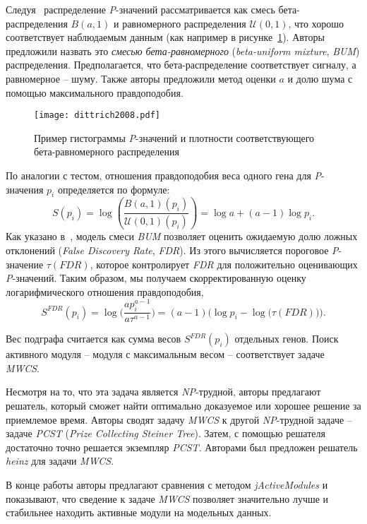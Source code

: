 Следуя~\cite{Pounds2003} распределение \emph{P}-значений рассматривается как
смесь бета-распределения $B(a, 1)$ и равномерного распределения
\(\mathcal{U}(0, 1)\), что хорошо соответствует наблюдаемым данным (как
например в рисунке~\ref{fig_dittrich2008}).  Авторы предложили назвать это
\emph{смесью бета-равномерного} (\emph{beta-uniform mixture}, \emph{BUM})
распределения.  Предполагается, что бета-распределение соответствует сигналу,
а равномерное -- шуму.  Также авторы предложили метод оценки $a$ и долю
шума с помощью максимального правдоподобия.

\begin{figure}
    \centering
    \texttt{[image: dittrich2008.pdf]}
    \caption{Пример гистограммы \emph{P}-значений и плотности
        соответствующего бета-равномерного распределения
    \label{fig_dittrich2008}}
\end{figure}

По аналогии с тестом, отношения правдоподобия веса одного гена для
\emph{P}-значения $p_i$ определяется по формуле:
\[ S(p_i) = \log \left(\frac{B(a, 1)(p_i)}{\mathcal{U}(0, 1)(p_i)}\right)
= \log a + (a -1)\log p_i.\]
Как указано в~\cite{Pounds2003}, модель смеси \emph{BUM} позволяет оценить
ожидаемую долю ложных отклонений (\emph{False Discovery Rate}, \emph{FDR}). Из
этого вычисляется пороговое \emph{P}-значение $\tau(FDR)$, которое контролирует
\emph{FDR} для положительно оценивающих \emph{P}-значений. Таким образом, мы
получаем скорректированную оценку логарифмического отношения правдоподобия,
\[ S^{FDR}(p_i) = \log\Big(\frac{ap_i^{a-1}}{a\tau^{a-1}}\Big) = (a
- 1)\Big( \log p_i - \log \big(\tau(FDR)\big)\Big).\]

Вес подграфа считается как сумма весов $S^{FDR}(p_i)$ отдельных генов. Поиск
активного модуля -- модуля с максимальным весом -- соответствует задаче
\emph{MWCS}.

Несмотря на то, что эта задача является \emph{NP}-трудной, авторы предлагают
решатель, который сможет найти оптимально доказуемое или хорошее решение за
приемлемое время. Авторы сводят задачу \emph{MWCS} к другой \emph{NP}-трудной
задаче -- задаче \emph{PCST} (\emph{Prize Collecting Steiner Tree}). Затем,
с помощью решателя~\cite{Ljubic2006} достаточно точно решается экземпляр
\emph{PCST}. Авторами был предложен решатель \emph{heinz} для задачи
\emph{MWCS}.

В конце работы авторы предлагают сравнения с методом \emph{jActiveModules}
и показывают, что сведение к задаче \emph{MWCS} позволяет значительно лучше
и стабильнее находить активные модули на модельных данных.

